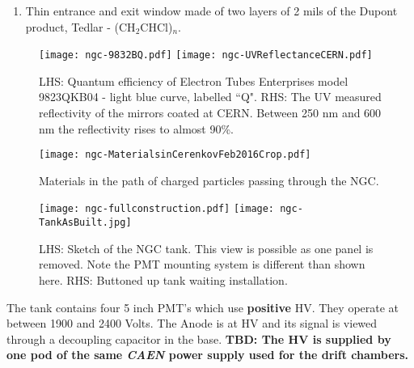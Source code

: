 {\begin{enumerate}
 The PMTs are model 9823QKB04 and tubes with serial numbers 16747,
 16777, 16787 and 16785 are installed to accept light from the mirrors
 in position Top Right, Top Left, Bottom Right and Bottom Left
 respectively while looking along increasing $z$. The tubes are
 surrounded by a mu-metal shield and the HV is distributed to the
 stages by a positive base.
\item Thin entrance and exit window made of two layers of 2 mils of
  the Dupont product, Tedlar - (CH$_2$CHCl)$_n$.
\end{enumerate}
\begin{figure}[!h] %
   \centering
   \texttt{[image: ngc-9832BQ.pdf]}
   \texttt{[image: ngc-UVReflectanceCERN.pdf]}
   \caption{LHS:
     Quantum efficiency of Electron Tubes Enterprises model 9823QKB04
     - light blue curve, labelled ``Q". RHS: The UV measured
     reflectivity of the mirrors coated at CERN. Between 250 nm and
     600 nm the reflectivity rises to almost
     90\%. \label{fig:tubeandmirror}}
   
\end{figure}
\begin{figure}[!h] %
   \centering
   \texttt{[image: ngc-MaterialsinCerenkovFeb2016Crop.pdf]}
   \caption{Materials
     in the path of charged particles passing through the
     NGC.\label{fig:materials}}
\end{figure}



\begin{figure}[!h] %
   \centering
   \texttt{[image: ngc-fullconstruction.pdf]}
   \texttt{[image: ngc-TankAsBuilt.jpg]}
   \caption{LHS: Sketch of the NGC tank. This view is possible as one
     panel is removed. Note the PMT mounting system is different than
     shown here.  RHS: Buttoned up tank waiting
     installation.\label{fig:Box}}
 
\end{figure}


The tank contains four 5 inch PMT's which use {\bf positive} HV. They
operate at between 1900 and 2400 Volts. The Anode is at HV and its
signal is viewed through a decoupling capacitor in the base. {\bf TBD:
  The HV is supplied by one pod of the same {\em CAEN} power supply
  used for the drift chambers.}

}
